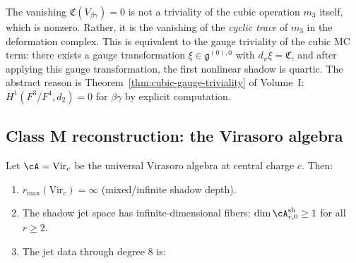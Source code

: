 \begin{remark}
The vanishing $\mathfrak{C}(V_{\beta\gamma}) = 0$ is not a triviality of the cubic
operation $m_3$ itself, which is nonzero. Rather, it is the vanishing of the
\emph{cyclic trace} of $m_3$ in the deformation complex. This is equivalent to the
gauge triviality of the cubic MC term: there exists a gauge transformation
$\xi \in \mathfrak{g}^{(0),0}$ with $d_\pi \xi = \mathfrak{C}$, and after applying
this gauge transformation, the first nonlinear shadow is quartic. The abstract reason
is Theorem~\ref*{thm:cubic-gauge-triviality} of Volume~I: $H^1(F^3/F^4, d_2) = 0$ for
$\beta\gamma$ by explicit computation.
\end{remark}

\subsection{Class M reconstruction: the Virasoro algebra}

\begin{theorem}
Let $\cA = \mathrm{Vir}_c$ be the universal Virasoro algebra at central charge $c$.
Then:
\begin{enumerate}[label=\textup{(\roman*)}]
\item $r_{\max}(\mathrm{Vir}_c) = \infty$ (mixed/infinite shadow depth).
\item The shadow jet space has infinite-dimensional fibers:
 $\dim \cA^{\mathrm{sh}}_{r,0} \geq 1$ for all $r \geq 2$.
\item The jet data through degree $8$ is:
\end{enumerate}
\end{theorem}

